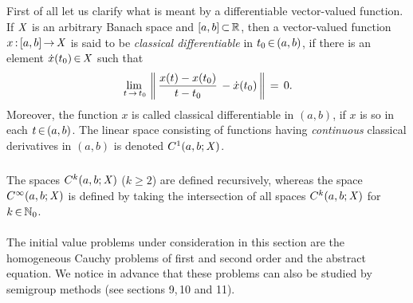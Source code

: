 \documentclass[11pt,twoside]{article}
\begin{document}
\subparagraph{} %
First of all let us clarify
what is meant by a differentiable vector-valued function.
If $\mathit{X}$ is an arbitrary Banach space and $[a,b] {\,\subset\,} {\mathbb{R}}$,
then a vector-valued function $x {\,:\,} [a,b] {\,\to\,} \mathit{X}$
is said to be \textit{classical differentiable} in $t_0 {\,\in\,} (a,b)$,
if there is an element $\dot{x}(t_0) {\,\in\,} \mathit{X}$ such that
\[
\lim_{\,t {\,\to\,} t_0} \,
\left\lVert  \, \frac{x(t)-x(t_0)}{t-t_0}\, - \dot{x}(t_0) \,  \right\rVert \,=\, 0.
\]
Moreover,
the function $x$ is called {classical differentiable in} $(a,b)$,
if $x$ is so in each $t {\,\in\,} (a,b)$.
The linear space consisting of functions having \textit{continuous}
classical derivatives in $(a,b)$ is denoted $C^1(a,b;\mathit{X})$.

\subparagraph{} %
The spaces $C^k(a,b;\mathit{X})$ ($k \geq 2$) are defined recursively,
whereas the space $C^{\infty}(a,b;\mathit{X})$ is defined
by taking the intersection of all spaces $C^k(a,b;\mathit{X})$ for $k {\,\in\,} {\mathbb{N}}_0$.

\paragraph{} %
The initial value problems under consideration in this section
are the homogeneous Cauchy problems of first and second order
and the abstract {\SCHROEDINGER} equation.
We notice in advance
that these problems can also be studied by semigroup methods
(see sections 9,\,10 and 11).
\end{document}
